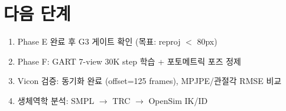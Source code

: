 \documentclass[11pt, a4paper]{article}
\begin{document}
\section{다음 단계}

\begin{enumerate}
    \item Phase E 완료 후 G3 게이트 확인 (목표: reproj $<$ 80px)
    \item Phase F: GART 7-view 30K step 학습 + 포토메트릭 포즈 정제
    \item Vicon 검증: 동기화 완료 (offset=125 frames), MPJPE/관절각 RMSE 비교
    \item 생체역학 분석: SMPL $\to$ TRC $\to$ OpenSim IK/ID
\end{enumerate}
\end{document}
